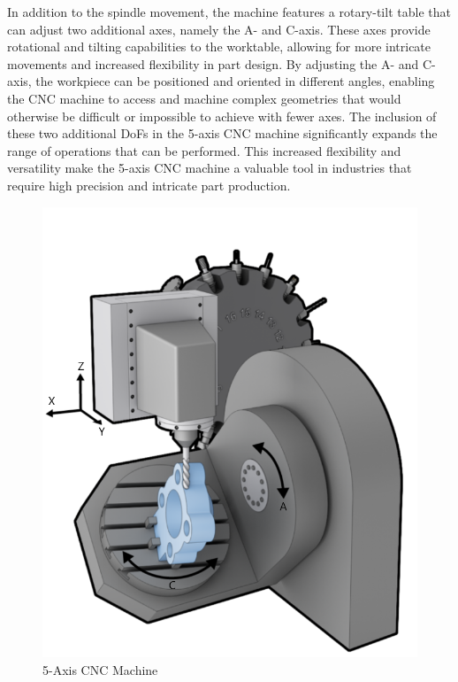In addition to the spindle movement, the machine features a rotary-tilt table that can adjust two additional axes, namely the A- and C-axis. These axes provide rotational and tilting capabilities to the worktable, allowing for more intricate movements and increased flexibility in part design. By adjusting the A- and C-axis, the workpiece can be positioned and oriented in different angles, enabling the \acrshort{CNC} machine to access and machine complex geometries that would otherwise be difficult or impossible to achieve with fewer axes. %
The inclusion of these two additional \acrshort{DoF}s in the 5-axis \acrshort{CNC} machine significantly expands the range of operations that can be performed. %
This increased flexibility and versatility make the 5-axis \acrshort{CNC} machine a valuable tool in industries that require high precision and intricate part production. %

\begin{figure}[H]
	\centerline{\includegraphics[scale=.58]{figures/5ax.png}}
	\caption{5-Axis CNC Machine~\cite{5ax}}
	\label{5ax}
\end{figure}
\newpage


